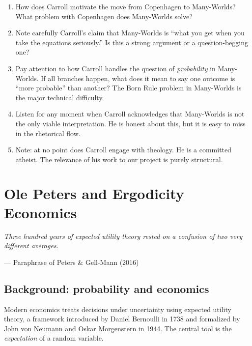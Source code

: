 \documentclass[11pt,a4paper]{book}
\theoremstyle{cleanrm}
\begin{document}
\begin{watchbox}
\begin{enumerate}[leftmargin=2em]
    \item How does Carroll motivate the move from Copenhagen to
    Many-Worlds? What problem with Copenhagen does Many-Worlds solve?
    \item Note carefully Carroll's claim that Many-Worlds is
    ``what you get when you take the equations seriously.''
    Is this a strong argument or a question-begging one?
    \item Pay attention to how Carroll handles the question of
    \emph{probability} in Many-Worlds. If all branches happen, what
    does it mean to say one outcome is ``more probable'' than another?
    The Born Rule problem in Many-Worlds is the major technical
    difficulty.
    \item Listen for any moment when Carroll acknowledges that
    Many-Worlds is not the only viable interpretation. He is honest
    about this, but it is easy to miss in the rhetorical flow.
    \item Note: at no point does Carroll engage with theology. He is
    a committed atheist. The relevance of his work to our project is
    purely structural.
\end{enumerate}
\end{watchbox}

\chapter{Ole Peters and Ergodicity Economics}

\epigraph{\itshape Three hundred years of expected utility theory rested
on a confusion of two very different averages.}
{--- Paraphrase of Peters \& Gell-Mann (2016)}

\section{Background: probability and economics}

Modern economics treats decisions under uncertainty using expected
utility theory, a framework introduced by Daniel Bernoulli in 1738 and
formalized by John von Neumann and Oskar Morgenstern in 1944. The
central tool is the \emph{expectation} of a random variable.
\end{document}
